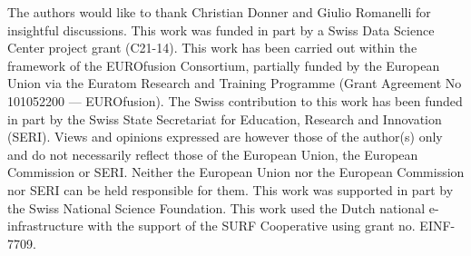 The authors would like to thank Christian Donner and Giulio Romanelli for insightful discussions. This work was funded in part by a Swiss Data Science Center project grant (C21-14). This work has been carried out within the framework of the EUROfusion Consortium, partially funded by the European Union via the Euratom Research and Training Programme (Grant Agreement No 101052200 — EUROfusion). The Swiss contribution to this work has been funded in part by the Swiss State Secretariat for Education, Research and Innovation (SERI). Views and opinions expressed are however those of the author(s) only and do not necessarily reflect those of the European Union, the European Commission or SERI. Neither the European Union nor the European Commission nor SERI can be held responsible for them. This work was supported in part by the Swiss National Science Foundation. This work used the Dutch national e-infrastructure with the support of the SURF Cooperative using grant no. EINF-7709.
